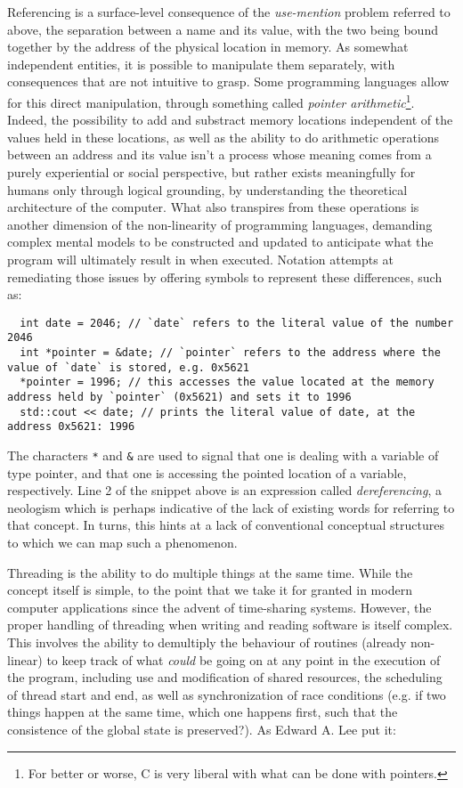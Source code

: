 Referencing is a surface-level consequence of the \emph{use-mention} problem referred to above, the separation between a name and its value, with the two being bound together by the address of the physical location in memory. As somewhat independent entities, it is possible to manipulate them separately, with consequences that are not intuitive to grasp. Some programming languages allow for this direct manipulation, through something called \emph{pointer arithmetic}\footnote{For better or worse, C is very liberal with what can be done with pointers.}. Indeed, the possibility to add and substract memory locations independent of the values held in these locations, as well as the ability to do arithmetic operations between an address and its value isn't a process whose meaning comes from a purely experiential or social perspective, but rather exists meaningfully for humans only through logical grounding, by understanding the theoretical architecture of the computer. What also transpires from these operations is another dimension of the non-linearity of programming languages, demanding complex mental models to be constructed and updated to anticipate what the program will ultimately result in when executed. Notation attempts at remediating those issues by offering symbols to represent these differences, such as:

\begin{lstlisting}
  int date = 2046; // `date` refers to the literal value of the number 2046
  int *pointer = &date; // `pointer` refers to the address where the value of `date` is stored, e.g. 0x5621
  *pointer = 1996; // this accesses the value located at the memory address held by `pointer` (0x5621) and sets it to 1996
  std::cout << date; // prints the literal value of date, at the address 0x5621: 1996
\end{lstlisting}

The characters \lstinline{*} and \lstinline{&} are used to signal that one is dealing with a variable of type pointer, and that one is accessing the pointed location of a variable, respectively. Line 2 of the snippet above is an expression called \emph{dereferencing}, a neologism which is perhaps indicative of the lack of existing words for referring to that concept. In turns, this hints at a lack of conventional conceptual structures to which we can map such a phenomenon.

Threading is the ability to do multiple things at the same time. While the concept itself is simple, to the point that we take it for granted in modern computer applications since the advent of time-sharing systems. However, the proper handling of threading when writing and reading software is itself complex. This involves the ability to demultiply the behaviour of routines (already non-linear) to keep track of what \emph{could} be going on at any point in the execution of the program, including use and modification of shared resources, the scheduling of thread start and end, as well as synchronization of race conditions (e.g. if two things happen at the same time, which one happens first, such that the consistence of the global state is preserved?). As Edward A. Lee put it:

